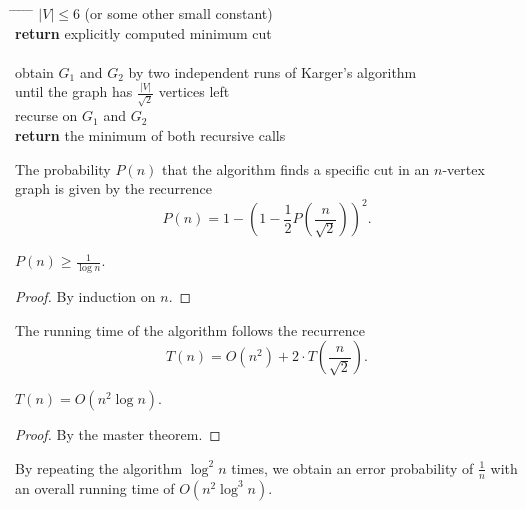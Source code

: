 \begin{tabbing}
\hspace*{.25in} \= \hspace*{.25in} \= \hspace*{.25in} \= \hspace*{.25in} \= \hspace*{.25in} \=\kill
{} $|V| \leq 6$ (or some other small constant) \\
\>\> {\bf return} explicitly computed minimum cut \\
 \\
\>\> obtain $G_1$ and $G_2$ by two independent runs of Karger's algorithm \\
\>\>\> until the graph has $\frac{|V|}{\sqrt{2}}$ vertices left\\
\>\> recurse on $G_1$ and $G_2$ \\
\>\> {\bf return} the minimum of both recursive calls
\end{tabbing}

The probability $P(n)$ that the algorithm finds a specific cut in an $n$-vertex
graph is given by the recurrence
\[
P(n) = 1 - \left( 1 - \frac{1}{2} P\left(\frac{n}{\sqrt{2}}\right)\right)^2.
\]

\begin{lemma}
  $P(n) \geq \frac{1}{\log n}$.
\end{lemma}
\begin{proof}
  By induction on $n$.
\end{proof}

The running time of the algorithm follows the recurrence
\[
T(n) = O(n^2) + 2 \cdot T\left(\frac{n}{\sqrt{2}}\right).
\]

\begin{lemma}
  $T(n) = O(n^2 \log n)$.
\end{lemma}
\begin{proof}
  By the master theorem.
\end{proof}

By repeating the algorithm $\log^2 n$ times, we obtain an error probability of
$\frac{1}{n}$ with an overall running time of $O(n^2 \log^3 n)$.

